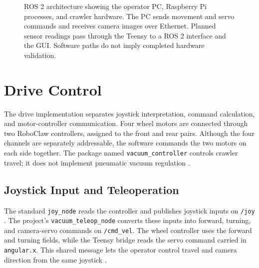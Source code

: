 \begin{figure}[p]
\caption[ROS 2 architecture across the operator PC and crawler]{ROS 2 architecture showing the operator PC, Raspberry Pi processes, and crawler hardware. The PC sends movement and servo commands and receives camera images over Ethernet. Planned sensor readings pass through the Teensy to a ROS 2 interface and the GUI. Software paths do not imply completed hardware validation.}
\label{fig:control-communications}
\end{figure}
\clearpage
\section{Drive Control}
\label{sec:drive-control}
The drive implementation separates joystick interpretation, command calculation, and motor-controller communication. Four wheel motors are connected through two RoboClaw controllers, assigned to the front and rear pairs. Although the four channels are separately addressable, the software commands the two motors on each side together. The package named \texttt{vacuum\_controller} controls crawler travel; it does not implement pneumatic vacuum regulation \citep{hernandezVacuumCrawler2026}.

\subsection{Joystick Input and Teleoperation}
\label{sec:joystick-teleoperation}
The standard \texttt{joy\_node} reads the controller and publishes joystick inputs on \texttt{/joy} \citep{rosJoyDriver}. The project's \texttt{vacuum\_teleop\_node} converts these inputs into forward, turning, and camera-servo commands on \texttt{/cmd\_vel}. The wheel controller uses the forward and turning fields, while the Teensy bridge reads the servo command carried in \texttt{angular.x}. This shared message lets the operator control travel and camera direction from the same joystick \citep{hernandezVacuumCrawler2026}.
